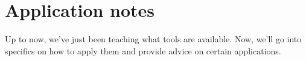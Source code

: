 
\chapter{Application notes}

Up to now, we've just been teaching what tools are available. Now, we'll go into
specifics on how to apply them and provide advice on certain applications.






